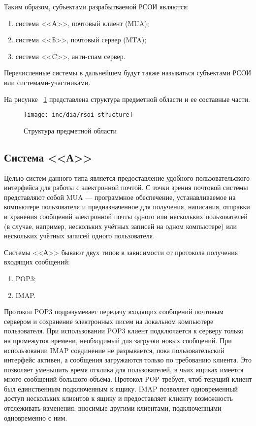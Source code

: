 Таким образом, субъектами разрабытваемой РСОИ являются:

\begin{enumerate}
\item{система <<А>>}, почтовый клиент (MUA);
\item{система <<Б>>}, почтовый сервер (MTA);
\item{система <<C>>}, анти-спам сервер. 
\end{enumerate}

Перечисленные системы в дальнейшем будут также называться субъектами РСОИ или системами-участниками.

На рисунке ~\ref{fig:fig01} представлена структура предметной области и ее составные части.

\begin{figure}
  \centering
  \texttt{[image: inc/dia/rsoi-structure]}
  \caption{Структура предметной области}
  \label{fig:fig01}
\end{figure}


\subsection{Система <<А>>}
Целью систем данного типа является предоставление удобного пользовательского интерфейса для работы с электронной почтой. С точки зрения почтовой системы представляют собой MUA --- программное обеспечение, устанавливаемое на компьютере пользователя и предназначенное для получения, написания, отправки и хранения сообщений электронной почты одного или нескольких пользователей (в случае, например, нескольких учётных записей на одном компьютере) или нескольких учётных записей одного пользователя. 

Системы <<А>> бывают двух типов в зависимости от протокола получения входящих сообщений:
\begin{enumerate}
\item{POP3;}
\item{IMAP.}
\end{enumerate}

Протокол POP3 подразумевает передачу входящих сообщений почтовым сервером и сохранение электронных писем на локальном компьютере пользователя. При использовании POP3 клиент подключается к серверу только на промежуток времени, необходимый для загрузки новых сообщений. При использовании IMAP соединение не разрывается, пока пользовательский интерфейс активен, а сообщения загружаются только по требованию клиента. Это позволяет уменьшить время отклика для пользователей, в чьих ящиках имеется много сообщений большого объёма.
Протокол POP требует, чтоб текущий клиент был единственным подключенным к ящику. IMAP позволяет одновременный доступ нескольких клиентов к ящику и предоставляет клиенту возможность отслеживать изменения, вносимые другими клиентами, подключенными одновременно с ним.


